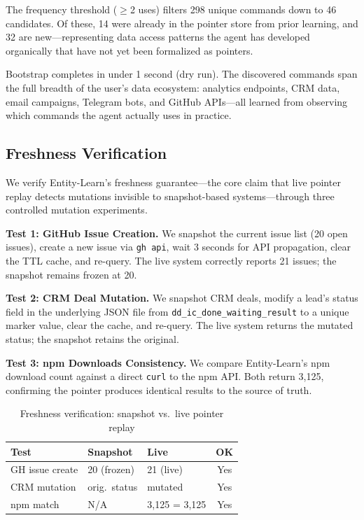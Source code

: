 \documentclass[11pt,twocolumn]{article}
\begin{document}
The frequency threshold ($\geq$2 uses) filters 298 unique commands down to 46 candidates. Of these, 14 were already in the pointer store from prior learning, and 32 are new---representing data access patterns the agent has developed organically that have not yet been formalized as pointers.

Bootstrap completes in under 1 second (dry run). The discovered commands span the full breadth of the user's data ecosystem: analytics endpoints, CRM data, email campaigns, Telegram bots, and GitHub APIs---all learned from observing which commands the agent actually uses in practice.


\subsection{Freshness Verification}

We verify Entity-Learn's freshness guarantee---the core claim that live pointer replay detects mutations invisible to snapshot-based systems---through three controlled mutation experiments.

\textbf{Test 1: GitHub Issue Creation.} We snapshot the current issue list (20 open issues), create a new issue via \texttt{gh api}, wait 3 seconds for API propagation, clear the TTL cache, and re-query. The live system correctly reports 21 issues; the snapshot remains frozen at 20.

\textbf{Test 2: CRM Deal Mutation.} We snapshot CRM deals, modify a lead's status field in the underlying JSON file from \texttt{dd\_ic\_done\_waiting\_result} to a unique marker value, clear the cache, and re-query. The live system returns the mutated status; the snapshot retains the original.

\textbf{Test 3: npm Downloads Consistency.} We compare Entity-Learn's npm download count against a direct \texttt{curl} to the npm API. Both return 3{,}125, confirming the pointer produces identical results to the source of truth.

\begin{table}[t]
\centering\small
\caption{Freshness verification: snapshot vs.\ live pointer replay}
\label{tab:freshness}
\begin{tabular}{@{}lp{1.6cm}p{1.8cm}c@{}}
\toprule
\textbf{Test} & \textbf{Snapshot} & \textbf{Live} & \textbf{OK} \\
\midrule
GH issue create & 20 (frozen) & 21 (live) & Yes \\
CRM mutation & orig.\ status & mutated & Yes \\
npm match & N/A & 3{,}125 = 3{,}125 & Yes \\
\bottomrule
\end{tabular}
\end{table}
\end{document}
